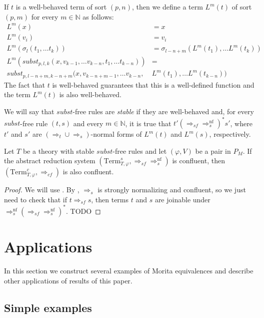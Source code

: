 \documentclass[reqno]{amsart}
\theoremstyle{definition}
\theoremstyle{remark}
\newcommand{\nf}{\mathrm{nf}}
\newcommand{\Term}{\mathrm{Term}}
\newcommand{\subst}{\mathit{subst}}
\numberwithin{figure}{section}
\begin{document}
If $t$ is a well-behaved term of sort $(p,n)$, then we define a term $L^m(t)$ of sort $(p,m)$ for every $m \in \mathbb{N}$ as follows:
\begin{align*}
L^m(x) & = x \\
L^m(v_i) & = v_i \\
L^m(\sigma_l(t_1, \ldots t_k)) & = \sigma_{l-n+m}(L^m(t_1), \ldots L^m(t_k)) \\
L^m(\subst_{p,l,k}(x, v_{k-1}, \ldots v_{k-n}, t_1, \ldots t_{k-n})) & = \\
\subst_{p,l-n+m,k-n+m}(x, v_{k-n+m-1}, \ldots v_{k-n}, & L^m(t_1), \ldots L^m(t_{k-n}))
\end{align*}
The fact that $t$ is well-behaved guarantees that this is a well-defined function and the term $L^m(t)$ is also well-behaved.

We will say that $\subst$-free rules are \emph{stable} if they are well-behaved and, for every $\subst$-free rule $(t,s)$ and every $m \in \mathbb{N}$, it is true that $t' (\Rightarrow_{sf} \Rightarrow_s^\nf)^* s'$,
where $t'$ and $s'$ are $(\Rightarrow_t \cup \Rightarrow_s)$-normal forms of $L^m(t)$ and $L^m(s)$, respectively.

\begin{prop}
Let $T$ be a theory with stable $\subst$-free rules and let $(\varphi,V)$ be a pair in $P_M$.
If the abstract reduction system $(\Term_{T,\varphi}^s, \Rightarrow_{sf} \Rightarrow_s^\nf)$ is confluent, then $(\Term_{T,\varphi}^c,\Rightarrow_{cf})$ is also confluent.
\end{prop}
\begin{proof}
We will use .
By , $\Rightarrow_s$ is strongly normalizing and confluent, so we just need to check that if $t \Rightarrow_{sf} s$,
then terms $t$ and $s$ are joinable under $\Rightarrow_s^\nf (\Rightarrow_{sf} \Rightarrow_s^\nf)^*$.
TODO
\end{proof}

\section{Applications}
\label{sec:applications}

In this section we construct several examples of Morita equivalences and describe other applications of results of this paper.

\subsection{Simple examples}
\label{sec:simp-applications}
\end{document}
